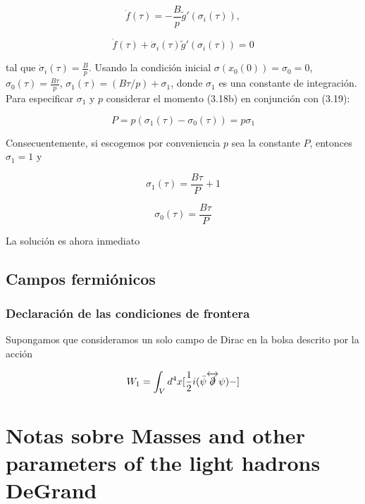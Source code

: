 \begin{equation}
\dot{f}(\tau) = -\frac{B}{p} \tilde{g}'({\sigma}_{i}(\tau)),
\end{equation}

\begin{equation}
\dot{f}(\tau) + \dot{\sigma}_{i} (\tau) \tilde{g}' ({\sigma}_{i} (\tau)) = 0
\end{equation}

tal que $\dot{\sigma}_{i} (\tau) = \frac{B}{p}$. Usando la condición inicial ${\sigma} ({x}_{0}(0)) = {\sigma}_{0} = 0$, ${\sigma}_{0}(\tau) = \frac{B \tau}{p}$, ${\sigma}_{1}(\tau) = (B \tau / p) + {\sigma}_{1}$, donde ${\sigma}_{1}$ es una constante de integración. Para especificar ${\sigma}_{1}$ y $p$ considerar el momento (3.18b) en conjunción con (3.19):

\[
P = p ({\sigma}_{1} (\tau) - {\sigma}_{0} (\tau)) = p {\sigma}_{1}
\]

Consecuentemente, si escogemos por conveniencia $p$ sea la constante $P$, entonces ${\sigma}_{1} = 1$ y

\begin{equation}
{\sigma}_{1} (\tau) = \frac{B \tau}{P} + 1
\end{equation}

\begin{equation}
{\sigma}_{0} (\tau) = \frac{B \tau}{P}
\end{equation}

La solución es ahora inmediato 


\section{Campos fermiónicos} 

\subsection{Declaración de las condiciones de frontera}

Supongamos que consideramos un solo campo de Dirac en la bolsa descrito por la acción

\begin{equation}
{W}_{1} = \int_{V} {d}^{4} x [\frac{1}{2} i (\bar{\psi} \overleftrightarrow{\slashed{\partial}} \psi) - ]
\end{equation}




\chapter{Notas sobre Masses and other parameters of the light hadrons DeGrand }

